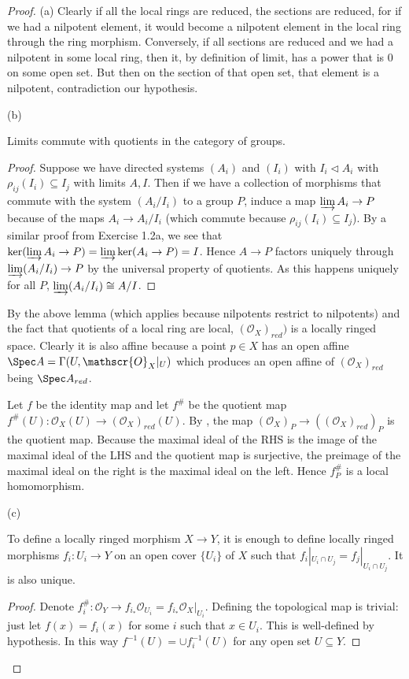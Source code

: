 \begin{proof}
	(a) Clearly if all the local rings are reduced, the sections are reduced, for if we had a nilpotent element, it would become a nilpotent element in the local ring through the ring morphism.
	Conversely, if all sections are reduced and we had a nilpotent in some local ring, then it, by definition of limit, has a power that is $0$ on some open set.
	But then on the section of that open set, that element is a nilpotent, contradiction our hypothesis.

	(b) 
	\begin{lem}\label{lem:limquotient}
		Limits commute with quotients in the category of groups.
	\end{lem}
	\begin{proof}
		Suppose we have directed systems $(A_i) $ and $(I_i) $ with $I_i \triangleleft A_i$ with $\rho_{ij}(I_i) \subseteq I_j $ with limits $A, I $.
		Then if we have a collection of morphisms that commute with the system $(A_i / I_i)$ to a group $P $, induce a map $\varinjlim A_i \to P $ because of the maps $A_i \to A_i / I_i $ (which commute because $\rho_{ij}(I_i) \subseteq I_j $).
		By a similar proof from Exercise 1.2a, we see that $\ker(\varinjlim A_i \to P) = \varinjlim \ker (A_i \to P) = I$.
		Hence $A \to P $ factors uniquely through $\varinjlim (A_i /I_i) \to P $ by the universal property of quotients.
		As this happens uniquely for all $P $, $\varinjlim (A_i /I_i) \cong A / I $.
	\end{proof}

	By the above lemma (which applies because nilpotents restrict to nilpotents) and the fact that quotients of a local ring are local, $(\mathscr{O}_X)_{red}) $ is a locally ringed space.
	Clearly it is also affine because a point $p \in X $ has an open affine $\Spec A = \Gamma(U, \mathscr{O}_X|_U)$ which produces an open affine of $(\mathscr{O}_X)_{red} $ being $\Spec A_{red} $.

	Let $f $ be the identity map and let $f^\# $ be the quotient map $f^\#(U): \mathscr{O}_X(U) \to (\mathscr{O}_X)_{red}(U) $.
	By , the map $(\mathscr{O}_X)_P \to ((\mathscr{O}_X)_{red})_P$ is the quotient map.
	Because the maximal ideal of the RHS is the image of the maximal ideal of the LHS and the quotient map is surjective, the preimage of the maximal ideal on the right is the maximal ideal on the left.
	Hence $f^\#_P $ is a local homomorphism.

	(c) 
	\begin{lem}\label{lem:constsheafmorphism}
		To define a locally ringed morphism $X\to Y $, it is enough to define locally ringed morphisms $f_i: U_i \to Y$ on an open cover $\{U_i\}   $ of $X $ such that $f_i|_{U_i\cap U_j} = f_j|_{U_i\cap U_j}$.
		It is also unique.
	\end{lem}
	\begin{proof}
		Denote $f_i^\#: \mathscr{O}_Y \to f_{i_\ast} \mathscr{O}_{U_i} = f_{i_\ast} \mathscr{O}_X|_{U_i} $.
		Defining the topological map is trivial: just let $f(x) = f_i(x) $ for some $i $ such that $x\in U_i $.
		This is well-defined by hypothesis.
		In this way $f^{-1}(U) = \cup f_i^{-1}(U) $ for any open set $U \subseteq Y $.


\end{proof}
\end{proof}
